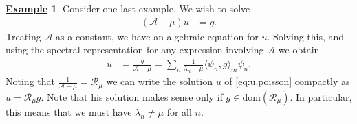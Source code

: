 \documentclass[12pt]{book}
\numberwithin{equation}{chapter}
\theoremstyle{plain}
\numberwithin{theorem}{section}
\theoremstyle{definition}
\newtheorem{example}[theorem]{\underline{Example}}
\numberwithin{exercise}{chapter}
\newcommand{\<}{\langle}
\renewcommand{\>}{\rangle}
\renewcommand{\(}{\left(}
\renewcommand{\)}{\right)}
\renewcommand{\[}{\left[}
\renewcommand{\]}{\right]}
\newcommand\Ac{\mathscr{A}}
\newcommand\Rc{\mathscr{R}}
\newcommand\lam{\lambda}
\begin{document}
\begin{example}
Consider one last example.  We wish to solve
\begin{align}
(\Ac - \mu) u
	&=	g . \label{eq:u.poisson}
\end{align}
Treating $\Ac$ as a constant, we have an algebraic equation for $u$.  Solving this, and using the spectral representation for any expression involving $\Ac$ we obtain
\begin{align}
u
	&=	\frac{g}{\Ac - \mu} = \sum_n \frac{1}{\lam_n - \mu} \< \psi_n, g \>_m \psi_n .
\end{align}
Noting that $\frac{1}{\Ac - \mu} = \Rc_\mu$ we can write the solution $u$ of \eqref{eq:u.poisson} compactly as $u = \Rc_\mu g$.  Note that his solution makes sense only if $g \in \text{dom}(\Rc_\mu)$.  In particular, this means that we must have $\lam_n \neq \mu$ for all $n$.
\end{example}
\end{document}
